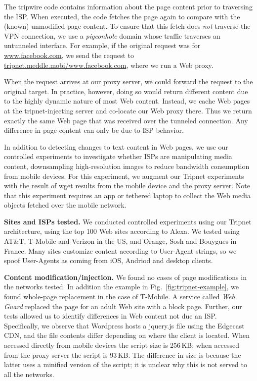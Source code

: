 The tripwire code contains information about the page content prior to traversing the ISP. When 
executed, the code fetches the page again to compare with the (known) unmodified page content.  
To ensure that this fetch does \emph{not} traverse the VPN connection, we use a \emph{pigeonhole} domain 
whose traffic traverses an untunneled interface. For example, if the original request was for \url{www.facebook.com}, 
we send the request to \url{tripnet.meddle.mobi/www.facebook.com}, where we run a Web proxy. 

When the request arrives at our proxy server, we could forward the request to the original target. In 
practice, however, doing so would return different content due to the highly dynamic nature of most 
Web content. Instead, we cache Web pages at the tripnet-injecting server and co-locate our Web proxy 
there. Thus we return exactly the same Web page that was received over the tunneled connection. 
Any difference in page content can only be due to ISP behavior. 

In addition to detecting changes to text content in 
Web pages, we use our controlled experiments to investigate whether ISPs are manipulating 
media content, \eg downsampling high-resolution images to reduce bandwidth consumption 
from mobile devices. For this experiment, we augment our Tripnet experiments with the result 
of wget results from the mobile device and the proxy server. Note that this experiment requires an 
app or tethered laptop to collect the Web media objects fetched over the mobile network.

\noindent\textbf{Sites and ISPs tested.} We conducted controlled experiments using our Tripnet 
architecture, using the top 100 Web sites according to Alexa. We tested using 
AT\&T, T-Mobile and Verizon in the US, and Orange, Sosh and Bouygues in France. 
Many sites customize content according to User-Agent strings, so we spoof User-Agents 
as coming from iOS, Andriod and desktop clients.

\noindent\textbf{Content modification/injection.} We found no cases of page modifications in 
the networks tested. In addition the example in Fig.~\ref{fig:tripnet-example}, we found whole-page replacement in the case of T-Mobile. A 
service called \emph{Web Guard} replaced the page for an adult Web site with a block page. 
Further, our tests allowed us to identify differences in Web content not due an ISP. Specifically, 
we observe that Wordpress hosts a jquery.js file using the Edgecast CDN, and the file contents 
differ depending on where the client is located. When accessed directly from mobile devices the 
script size is 256\,KB; when accessed from the proxy server the script is 93\,KB. The difference in 
size is because the latter uses a minified version of the script; it is unclear why this is not served 
to all the networks.

